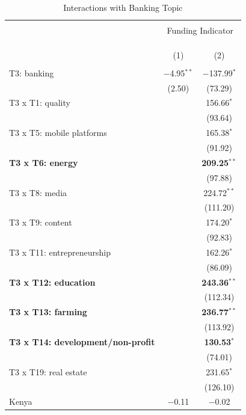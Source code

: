 \documentclass[12pt]{article}
\begin{document}
\begin{table}[!htbp] \centering 
  \caption{Interactions with Banking Topic} 
  \label{} 
\footnotesize 
\begin{tabular}{@{\extracolsep{5pt}}lcc} 
\\[-1.8ex]\hline 
\hline \\[-1.8ex] 
 & \multicolumn{2}{c}{Funding Indicator} \\ 
\cline{2-3} 
\\[-1.8ex] & \multicolumn{2}{c}{} \\ 
\\[-1.8ex] & (1) & (2)\\ 
\hline \\[-1.8ex] 
  T3: banking & $-$4.95$^{**}$ & $-$137.99$^{*}$ \\ 
  & (2.50) & (73.29) \\ 
  T3 x T1: quality &  & 156.66$^{*}$ \\ 
  &  & (93.64) \\ 
  T3 x T5: mobile platforms &  & 165.38$^{*}$ \\ 
  &  & (91.92) \\ 
  \textbf{T3 x T6: energy} &  & \textbf{209.25}$^{**}$ \\ 
  &  & (97.88) \\ 
  T3 x T8: media &  & 224.72$^{**}$ \\ 
  &  & (111.20) \\ 
  T3 x T9: content &  & 174.20$^{*}$ \\ 
  &  & (92.83) \\ 
  T3 x T11: entrepreneurship &  & 162.26$^{*}$ \\ 
  &  & (86.09) \\ 
  \textbf{T3 x T12: education} &  & \textbf{243.36}$^{**}$ \\ 
  &  & (112.34) \\ 
  \textbf{T3 x T13: farming} &  & \textbf{236.77}$^{**}$ \\ 
  &  & (113.92) \\ 
  \textbf{T3 x T14: development/non-profit} &  & \textbf{130.53}$^{*}$ \\ 
  &  & (74.01) \\ 
  T3 x T19: real estate &  & 231.65$^{*}$ \\ 
  &  & (126.10) \\ 
  Kenya & $-$0.11 & $-$0.02 \\ 

\end{tabular}
\end{table}
\end{document}
